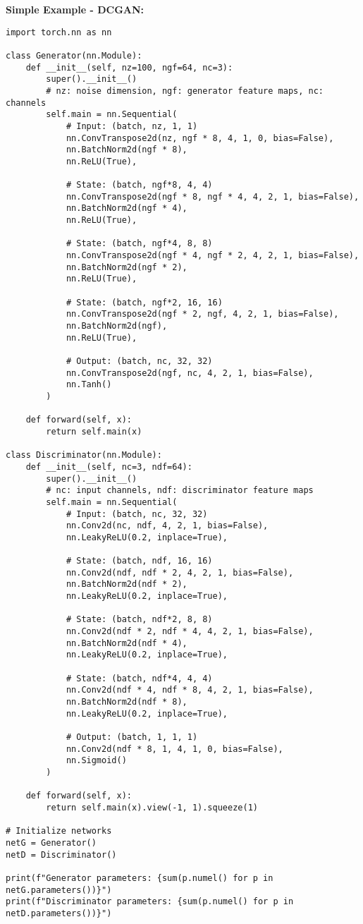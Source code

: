\documentclass[11pt,a4paper]{book}
\begin{document}
\textbf{Simple Example - DCGAN:}
\begin{verbatim}
import torch.nn as nn

class Generator(nn.Module):
    def __init__(self, nz=100, ngf=64, nc=3):
        super().__init__()
        # nz: noise dimension, ngf: generator feature maps, nc: channels
        self.main = nn.Sequential(
            # Input: (batch, nz, 1, 1)
            nn.ConvTranspose2d(nz, ngf * 8, 4, 1, 0, bias=False),
            nn.BatchNorm2d(ngf * 8),
            nn.ReLU(True),
            
            # State: (batch, ngf*8, 4, 4)
            nn.ConvTranspose2d(ngf * 8, ngf * 4, 4, 2, 1, bias=False),
            nn.BatchNorm2d(ngf * 4),
            nn.ReLU(True),
            
            # State: (batch, ngf*4, 8, 8)
            nn.ConvTranspose2d(ngf * 4, ngf * 2, 4, 2, 1, bias=False),
            nn.BatchNorm2d(ngf * 2),
            nn.ReLU(True),
            
            # State: (batch, ngf*2, 16, 16)
            nn.ConvTranspose2d(ngf * 2, ngf, 4, 2, 1, bias=False),
            nn.BatchNorm2d(ngf),
            nn.ReLU(True),
            
            # Output: (batch, nc, 32, 32)
            nn.ConvTranspose2d(ngf, nc, 4, 2, 1, bias=False),
            nn.Tanh()
        )
    
    def forward(self, x):
        return self.main(x)

class Discriminator(nn.Module):
    def __init__(self, nc=3, ndf=64):
        super().__init__()
        # nc: input channels, ndf: discriminator feature maps
        self.main = nn.Sequential(
            # Input: (batch, nc, 32, 32)
            nn.Conv2d(nc, ndf, 4, 2, 1, bias=False),
            nn.LeakyReLU(0.2, inplace=True),
            
            # State: (batch, ndf, 16, 16)
            nn.Conv2d(ndf, ndf * 2, 4, 2, 1, bias=False),
            nn.BatchNorm2d(ndf * 2),
            nn.LeakyReLU(0.2, inplace=True),
            
            # State: (batch, ndf*2, 8, 8)
            nn.Conv2d(ndf * 2, ndf * 4, 4, 2, 1, bias=False),
            nn.BatchNorm2d(ndf * 4),
            nn.LeakyReLU(0.2, inplace=True),
            
            # State: (batch, ndf*4, 4, 4)
            nn.Conv2d(ndf * 4, ndf * 8, 4, 2, 1, bias=False),
            nn.BatchNorm2d(ndf * 8),
            nn.LeakyReLU(0.2, inplace=True),
            
            # Output: (batch, 1, 1, 1)
            nn.Conv2d(ndf * 8, 1, 4, 1, 0, bias=False),
            nn.Sigmoid()
        )
    
    def forward(self, x):
        return self.main(x).view(-1, 1).squeeze(1)

# Initialize networks
netG = Generator()
netD = Discriminator()

print(f"Generator parameters: {sum(p.numel() for p in netG.parameters())}")
print(f"Discriminator parameters: {sum(p.numel() for p in netD.parameters())}")
\end{verbatim}
\end{document}
